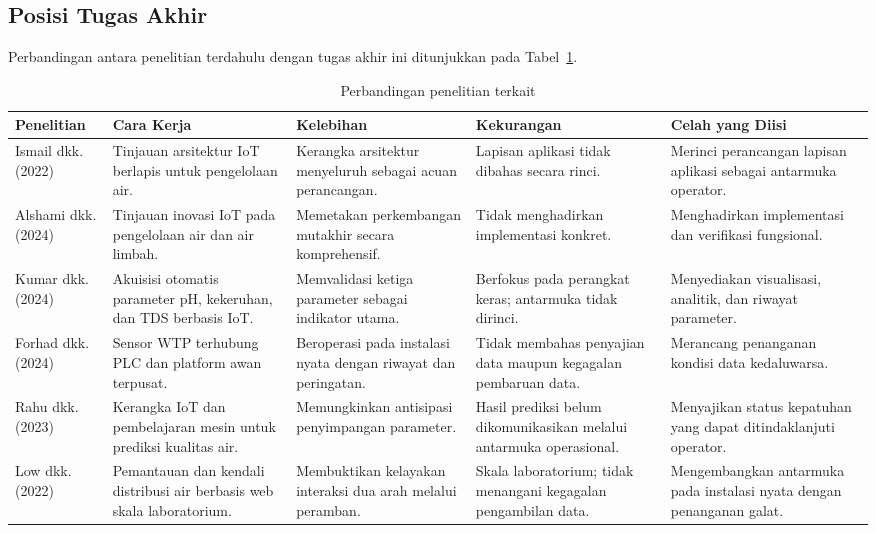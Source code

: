 \subsection{Posisi Tugas Akhir}
Perbandingan antara penelitian terdahulu dengan tugas akhir ini ditunjukkan pada
Tabel~\ref{tab:penelitian-terkait}.

\begin{table}[htbp]
\centering
\caption{Perbandingan penelitian terkait}
\label{tab:penelitian-terkait}
\renewcommand{\arraystretch}{1.25}
\small
\begin{tabular}{|p{1.8cm}|p{2.8cm}|p{3.2cm}|p{3.2cm}|p{3cm}|}
\hline
\textbf{Penelitian} & \textbf{Cara Kerja} & \textbf{Kelebihan} & \textbf{Kekurangan} & \textbf{Celah yang Diisi} \\ \hline

Ismail dkk. (2022) &
Tinjauan arsitektur IoT berlapis untuk pengelolaan air. &
Kerangka arsitektur menyeluruh sebagai acuan perancangan. &
Lapisan aplikasi tidak dibahas secara rinci. &
Merinci perancangan lapisan aplikasi sebagai antarmuka operator. \\ \hline

Alshami dkk. (2024) &
Tinjauan inovasi IoT pada pengelolaan air dan air limbah. &
Memetakan perkembangan mutakhir secara komprehensif. &
Tidak menghadirkan implementasi konkret. &
Menghadirkan implementasi dan verifikasi fungsional. \\ \hline

Kumar dkk. (2024) &
Akuisisi otomatis parameter pH, kekeruhan, dan TDS berbasis IoT. &
Memvalidasi ketiga parameter sebagai indikator utama. &
Berfokus pada perangkat keras; antarmuka tidak dirinci. &
Menyediakan visualisasi, analitik, dan riwayat parameter. \\ \hline

Forhad dkk. (2024) &
Sensor WTP terhubung PLC dan platform awan terpusat. &
Beroperasi pada instalasi nyata dengan riwayat dan peringatan. &
Tidak membahas penyajian data maupun kegagalan pembaruan data. &
Merancang penanganan kondisi data kedaluwarsa. \\ \hline

Rahu dkk. (2023) &
Kerangka IoT dan pembelajaran mesin untuk prediksi kualitas air. &
Memungkinkan antisipasi penyimpangan parameter. &
Hasil prediksi belum dikomunikasikan melalui antarmuka operasional. &
Menyajikan status kepatuhan yang dapat ditindaklanjuti operator. \\ \hline

Low dkk. (2022) &
Pemantauan dan kendali distribusi air berbasis web skala laboratorium. &
Membuktikan kelayakan interaksi dua arah melalui peramban. &
Skala laboratorium; tidak menangani kegagalan pengambilan data. &
Mengembangkan antarmuka pada instalasi nyata dengan penanganan galat. \\ \hline


\end{tabular}
\end{table}
